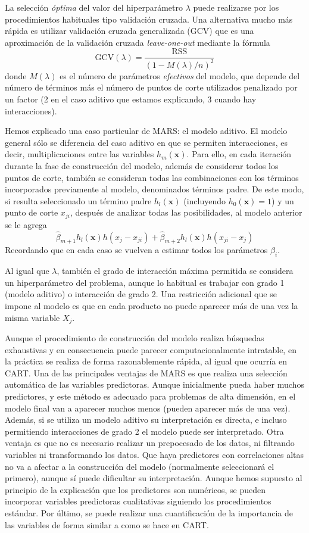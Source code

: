 \documentclass[
]{book}
\theoremstyle{break}
\theoremstyle{nonumberplain}
\begin{document}
La selección \emph{óptima} del valor del hiperparámetro \(\lambda\) puede realizarse por los procedimientos habituales tipo validación cruzada. Una alternativa mucho más rápida es utilizar validación cruzada generalizada (GCV) que es una aproximación de la validación cruzada \emph{leave-one-out} mediante la fórmula
\[\mbox{GCV} (\lambda) = \frac{\mbox{RSS}}{(1-M(\lambda)/n)^2}\]
donde \(M(\lambda)\) es el número de parámetros \emph{efectivos} del modelo, que depende del número de términos más el número de puntos de corte utilizados penalizado por un factor (2 en el caso aditivo que estamos explicando, 3 cuando hay interacciones).

Hemos explicado una caso particular de MARS: el modelo aditivo. El modelo general sólo se diferencia del caso aditivo en que se permiten interacciones, es decir, multiplicaciones entre las variables \(h_m(\mathbf{x})\).
Para ello, en cada iteración durante la fase de construcción del modelo, además de considerar todos los puntos de corte, también se consideran todas las combinaciones con los términos incorporados previamente al modelo, denominados términos padre.
De este modo, si resulta seleccionado un término padre \(h_l(\mathbf{x})\) (incluyendo \(h_0(\mathbf{x}) = 1\)) y un punto de corte \(x_{ji}\), después de analizar todas las posibilidades, al modelo anterior se le agrega
\[\hat \beta_{m+1} h_l(\mathbf{x}) h(x_j - x_{ji}) + \hat \beta_{m+2} h_l(\mathbf{x}) h(x_{ji} - x_j)\]
Recordando que en cada caso se vuelven a estimar todos los parámetros \(\beta_i\).

Al igual que \(\lambda\), también el grado de interacción máxima permitida se considera un hiperparámetro del problema, aunque lo habitual es trabajar con grado 1 (modelo aditivo) o interacción de grado 2. Una restricción adicional que se impone al modelo es que en cada producto no puede aparecer más de una vez la misma variable \(X_j\).

Aunque el procedimiento de construcción del modelo realiza búsquedas exhaustivas y en consecuencia puede parecer computacionalmente intratable, en la práctica se realiza de forma razonablemente rápida, al igual que ocurría en CART.
Una de las principales ventajas de MARS es que realiza una selección automática de las variables predictoras.
Aunque inicialmente pueda haber muchos predictores, y este método es adecuado para problemas de alta dimensión, en el modelo final van a aparecer muchos menos (pueden aparecer más de una vez).
Además, si se utiliza un modelo aditivo su interpretación es directa, e incluso permitiendo interacciones de grado 2 el modelo puede ser interpretado.
Otra ventaja es que no es necesario realizar un prepocesado de los datos, ni filtrando variables ni transformando los datos.
Que haya predictores con correlaciones altas no va a afectar a la construcción del modelo (normalmente seleccionará el primero), aunque sí puede dificultar su interpretación.
Aunque hemos supuesto al principio de la explicación que los predictores son numéricos, se pueden incorporar variables predictoras cualitativas siguiendo los procedimientos estándar.
Por último, se puede realizar una cuantificación de la importancia de las variables de forma similar a como se hace en CART.
\end{document}
